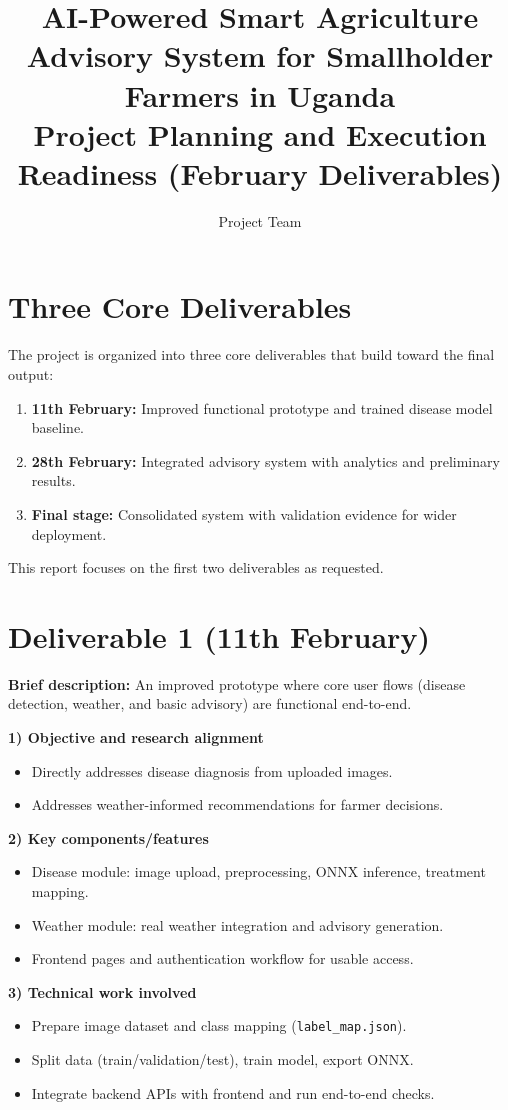 \documentclass[10pt,a4paper]{article}
\title{\textbf{AI-Powered Smart Agriculture Advisory System for Smallholder Farmers in Uganda}\\
\large Project Planning and Execution Readiness (February Deliverables)}
\author{Project Team}
\date{}
\begin{document}
\maketitle

\section*{Three Core Deliverables}
The project is organized into three core deliverables that build toward the final output:
\begin{enumerate}[noitemsep]
  \item \textbf{11th February:} Improved functional prototype and trained disease model baseline.
  \item \textbf{28th February:} Integrated advisory system with analytics and preliminary results.
  \item \textbf{Final stage:} Consolidated system with validation evidence for wider deployment.
\end{enumerate}

This report focuses on the first two deliverables as requested.

\section*{Deliverable 1 (11th February)}
\textbf{Brief description:} An improved prototype where core user flows (disease detection, weather, and basic advisory) are functional end-to-end.

\textbf{1) Objective and research alignment}
\begin{itemize}[noitemsep]
  \item Directly addresses disease diagnosis from uploaded images.
  \item Addresses weather-informed recommendations for farmer decisions.
\end{itemize}

\textbf{2) Key components/features}
\begin{itemize}[noitemsep]
  \item Disease module: image upload, preprocessing, ONNX inference, treatment mapping.
  \item Weather module: real weather integration and advisory generation.
  \item Frontend pages and authentication workflow for usable access.
\end{itemize}

\textbf{3) Technical work involved}
\begin{itemize}[noitemsep]
  \item Prepare image dataset and class mapping (\texttt{label\_map.json}).
  \item Split data (train/validation/test), train model, export ONNX.
  \item Integrate backend APIs with frontend and run end-to-end checks.
\end{itemize}
\end{document}
